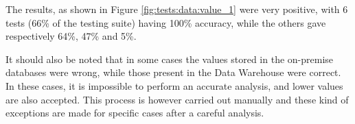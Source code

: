     The results, as shown in Figure \ref{fig:tests:data:value_1} were very positive, with 6 tests (66\% of the testing suite) having 100\% accuracy, while the others gave respectively 64\%, 47\% and 5\%.
    
    It should also be noted that in some cases the values stored in the on-premise databases were wrong, while those present in the Data Warehouse were correct.
    In these cases, it is impossible to perform an accurate analysis, and lower values are also accepted.
    This process is however carried out manually and these kind of exceptions are made for specific cases after a careful analysis.